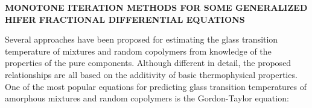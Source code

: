 \begin{center}
    {\fontsize{16}{16}\selectfont\textbf{\MakeUppercase{ Monotone Iteration Methods For Some Generalized Hifer Fractional Differential Equations}}}
\end{center}
\vspace{.2cm}
\begin{enabstract}
\vspace*{.2cm}
Several approaches have been proposed for estimating the glass transition temperature of mixtures and random copolymers from knowledge of the properties of the pure components. Although different in detail, the proposed relationships are all based on the additivity of basic thermophysical properties. One of the most popular equations for predicting glass transition temperatures of amorphous mixtures and random copolymers is the Gordon-Taylor equation:\\[.5em]

\end{enabstract}


\clearpage